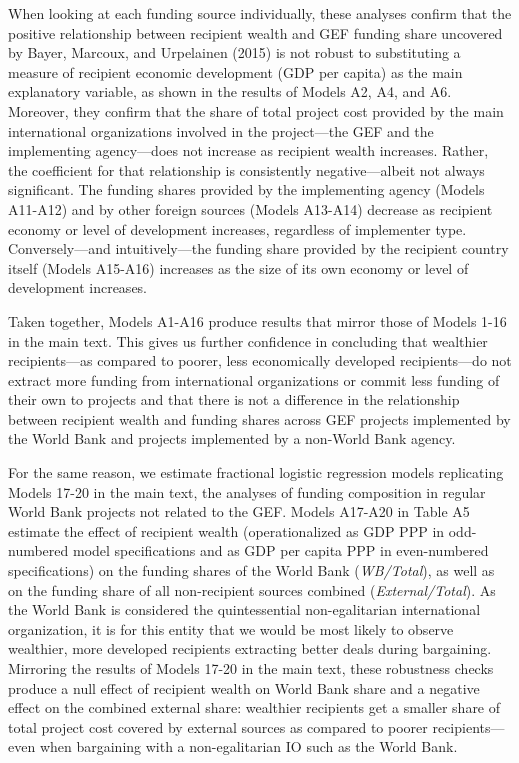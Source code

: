 \documentclass{article}
\begin{document}
When looking at each funding source individually, these analyses confirm that the positive relationship between recipient wealth and GEF funding share uncovered by Bayer, Marcoux, and Urpelainen (2015) is not robust to substituting a measure of recipient economic development (GDP per capita) as the main explanatory variable, as shown in the results of Models A2, A4, and A6.  Moreover, they confirm that the share of total project cost provided by the main international organizations involved in the project---the GEF and the implementing agency---does not increase as recipient wealth increases.  Rather, the coefficient for that relationship is consistently negative---albeit not always significant.  The funding shares provided by the implementing agency (Models A11-A12) and by other foreign sources (Models A13-A14) decrease as recipient economy or level of development increases, regardless of implementer type.  Conversely---and intuitively---the funding share provided by the recipient country itself (Models A15-A16) increases as the size of its own economy or level of development increases. 

Taken together, Models A1-A16 produce results that mirror those of Models 1-16 in the main text.  This gives us further confidence in concluding that wealthier recipients---as compared to poorer, less economically developed recipients---do not extract more funding from international organizations or commit less funding of their own to projects and that there is not a difference in the relationship between recipient wealth and funding shares across GEF projects implemented by the World Bank and projects implemented by a non-World Bank agency. 

For the same reason, we estimate fractional logistic regression models replicating Models 17-20 in the main text, the analyses of funding composition in regular World Bank projects not related to the GEF.  Models A17-A20 in Table A5 estimate the effect of recipient wealth (operationalized as GDP PPP in odd-numbered model specifications and as GDP per capita PPP in even-numbered specifications) on the funding shares of the World Bank (\textit{WB/Total}), as well as on the funding share of all non-recipient sources combined (\textit{External/Total}).  As the World Bank is considered the quintessential non-egalitarian international organization, it is for this entity that we would be most likely to observe wealthier, more developed recipients extracting better deals during bargaining.  Mirroring the results of Models 17-20 in the main text, these robustness checks produce a null effect of recipient wealth on World Bank share and a negative effect on the combined external share: wealthier recipients get a smaller share of total project cost covered by external sources as compared to poorer recipients---even when bargaining with a non-egalitarian IO such as the World Bank. 
			
\end{document}
